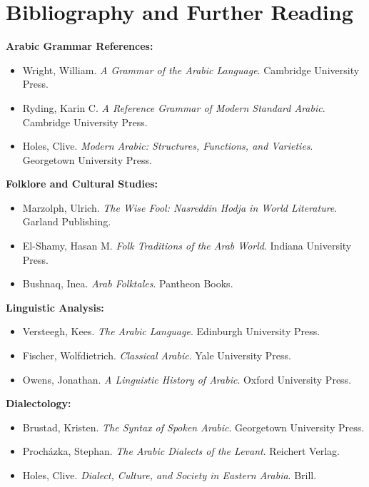 \documentclass[letterpaper,12pt]{article}
\begin{document}
\section{Bibliography and Further Reading}

\begin{tcolorbox}[colback=white,colframe=headercolor,title=\textbf{Recommended Sources},breakable]
\textbf{Arabic Grammar References:}
\begin{itemize}
\item Wright, William. \textit{A Grammar of the Arabic Language}. Cambridge University Press.
\item Ryding, Karin C. \textit{A Reference Grammar of Modern Standard Arabic}. Cambridge University Press.
\item Holes, Clive. \textit{Modern Arabic: Structures, Functions, and Varieties}. Georgetown University Press.
\end{itemize}

\textbf{Folklore and Cultural Studies:}
\begin{itemize}
\item Marzolph, Ulrich. \textit{The Wise Fool: Nasreddin Hodja in World Literature}. Garland Publishing.
\item El-Shamy, Hasan M. \textit{Folk Traditions of the Arab World}. Indiana University Press.
\item Bushnaq, Inea. \textit{Arab Folktales}. Pantheon Books.
\end{itemize}

\textbf{Linguistic Analysis:}
\begin{itemize}
\item Versteegh, Kees. \textit{The Arabic Language}. Edinburgh University Press.
\item Fischer, Wolfdietrich. \textit{Classical Arabic}. Yale University Press.
\item Owens, Jonathan. \textit{A Linguistic History of Arabic}. Oxford University Press.
\end{itemize}

\textbf{Dialectology:}
\begin{itemize}
\item Brustad, Kristen. \textit{The Syntax of Spoken Arabic}. Georgetown University Press.
\item Procházka, Stephan. \textit{The Arabic Dialects of the Levant}. Reichert Verlag.
\item Holes, Clive. \textit{Dialect, Culture, and Society in Eastern Arabia}. Brill.
\end{itemize}
\end{tcolorbox}
\end{document}
